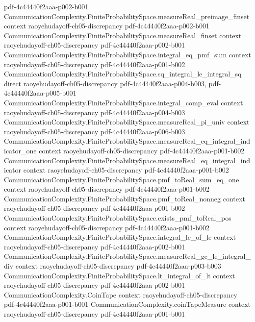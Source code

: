 \begin{lemma}
  {pdf-4c44440f2aaa-p002-b001}
\proofstep
  {CommunicationComplexity.FiniteProbabilitySpace.measureReal_preimage_finset}
  {context}
  {raoyehudayoff-ch05-discrepancy}
  {pdf-4c44440f2aaa-p002-b001}
\proofstep
  {CommunicationComplexity.FiniteProbabilitySpace.measureReal_finset}
  {context}
  {raoyehudayoff-ch05-discrepancy}
  {pdf-4c44440f2aaa-p002-b001}
\proofstep
  {CommunicationComplexity.FiniteProbabilitySpace.integral_eq_pmf_sum}
  {context}
  {raoyehudayoff-ch05-discrepancy}
  {pdf-4c44440f2aaa-p001-b002}
\proofstep
  {CommunicationComplexity.FiniteProbabilitySpace.sq_integral_le_integral_sq}
  {direct}
  {raoyehudayoff-ch05-discrepancy}
  {pdf-4c44440f2aaa-p004-b003,
    pdf-4c44440f2aaa-p005-b001}
\proofstep
  {CommunicationComplexity.FiniteProbabilitySpace.integral_comp_eval}
  {context}
  {raoyehudayoff-ch05-discrepancy}
  {pdf-4c44440f2aaa-p004-b003}
\proofstep
  {CommunicationComplexity.FiniteProbabilitySpace.measureReal_pi_univ}
  {context}
  {raoyehudayoff-ch05-discrepancy}
  {pdf-4c44440f2aaa-p006-b003}
\proofstep
  {CommunicationComplexity.FiniteProbabilitySpace.measureReal_eq_integral_indicator_one}
  {context}
  {raoyehudayoff-ch05-discrepancy}
  {pdf-4c44440f2aaa-p001-b002}
\proofstep
  {CommunicationComplexity.FiniteProbabilitySpace.measureReal_eq_integral_indicator}
  {context}
  {raoyehudayoff-ch05-discrepancy}
  {pdf-4c44440f2aaa-p001-b002}
\proofstep
  {CommunicationComplexity.FiniteProbabilitySpace.pmf_toReal_sum_eq_one}
  {context}
  {raoyehudayoff-ch05-discrepancy}
  {pdf-4c44440f2aaa-p001-b002}
\proofstep
  {CommunicationComplexity.FiniteProbabilitySpace.pmf_toReal_nonneg}
  {context}
  {raoyehudayoff-ch05-discrepancy}
  {pdf-4c44440f2aaa-p001-b002}
\proofstep
  {CommunicationComplexity.FiniteProbabilitySpace.exists_pmf_toReal_pos}
  {context}
  {raoyehudayoff-ch05-discrepancy}
  {pdf-4c44440f2aaa-p001-b002}
\proofstep
  {CommunicationComplexity.FiniteProbabilitySpace.integral_le_of_le}
  {context}
  {raoyehudayoff-ch05-discrepancy}
  {pdf-4c44440f2aaa-p002-b001}
\proofstep
  {CommunicationComplexity.FiniteProbabilitySpace.measureReal_ge_le_integral_div}
  {context}
  {raoyehudayoff-ch05-discrepancy}
  {pdf-4c44440f2aaa-p003-b003}
\proofstep
  {CommunicationComplexity.FiniteProbabilitySpace.lt_integral_of_lt}
  {context}
  {raoyehudayoff-ch05-discrepancy}
  {pdf-4c44440f2aaa-p002-b001}
\proofstep
  {CommunicationComplexity.CoinTape}
  {context}
  {raoyehudayoff-ch05-discrepancy}
  {pdf-4c44440f2aaa-p001-b001}
\proofstep
  {CommunicationComplexity.coinTapeMeasure}
  {context}
  {raoyehudayoff-ch05-discrepancy}
  {pdf-4c44440f2aaa-p001-b001}

\end{lemma}
